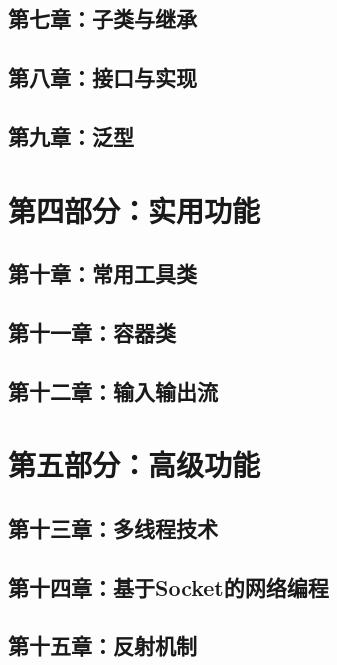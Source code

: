 \documentclass[xcolor=x11names,compress]{ctexbeamer}
\begin{document}
\subsection[第七章：子类与继承]{第七章：子类与继承}
\subsection[第八章：接口与实现]{第八章：接口与实现}
\subsection[第九章：泛型]{第九章：泛型}

\section[第四部分：实用功能]{第四部分：实用功能}
\subsection[第十章：常用工具类]{第十章：常用工具类}


\subsection[第十一章：容器类]{第十一章：容器类}


\subsection[第十二章：输入输出流]{第十二章：输入输出流}

\section[第五部分：高级功能]{第五部分：高级功能}
\subsection[第十三章：多线程技术]{第十三章：多线程技术}
\subsection[第十四章：基于Socket的网络编程]{第十四章：基于Socket的网络编程}
\subsection[第十五章：反射机制]{第十五章：反射机制}
\end{document}
